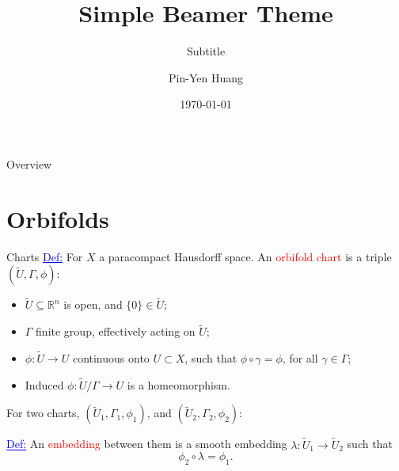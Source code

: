 \documentclass[aspectratio=169,xcolor=dvipsnames]{beamer}
\title[short title]{Simple Beamer Theme} %
\subtitle{Subtitle}
\author[Pin-Yen] {Pin-Yen Huang}
\institute[NTU] %
{
    Department of Computer Science and Information Engineering \\
    National Taiwan University %
}
\date{\today} %
\newcommand{\ra}{\rightarrow}
\newcommand{\RR}{\mathbb{R}}
\begin{document}
\begin{frame}
    \titlepage
\end{frame}

\begin{frame}{Overview}
    \tableofcontents
\end{frame}

\section{Orbifolds}

\begin{frame}{Charts}
	\textcolor{blue}{\underline{Def:}} For $X$ a paracompact Hausdorff space. An \textcolor{red}{orbifold chart} is a triple $(\widetilde{U}, \Gamma, \phi)$:
	\begin{itemize}
		\item $\widetilde{U} \subseteq \RR^{n}$ is open, and $\{0\} \in \widetilde{U}$;
		\item $\Gamma$ finite group, effectively acting on $\widetilde{U}$;
		\item $\phi : \widetilde{U} \ra U$ continuous onto $U \subset X$, \newline such that $\phi \circ \gamma = \phi$, for all $\gamma \in \Gamma$;
		\item Induced $\phi : \widetilde{U}/\Gamma \ra U$ is a homeomorphism.\newline
	\end{itemize}
	
	For two charts, $(\widetilde{U}_{1}, \Gamma_{1}, \phi_{1})$, and $(\widetilde{U}_{2}, \Gamma_{2}, \phi_{2})$: \newline
	
	\textcolor{blue}{\underline{Def:}} An \textcolor{red}{embedding} between them is a smooth embedding $\lambda : \widetilde{U}_{1} \ra \widetilde{U}_{2}$ such that
	\[
	\phi_{2} \circ \lambda = \phi_{1}.    
	\]
\end{frame}
\end{document}
